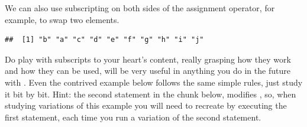 \documentclass[krantz2]{krantz}\usepackage{knitr}
\begin{document}
We can also use subscripting on both sides of the assignment operator, for example, to swap two elements.

\begin{knitrout}\footnotesize
{}\color{fgcolor}\begin{kframe}
\begin{alltt}
 \hlkwb{<-} \hlstd{letters[}\hlopt{:}\hlstd{]}
\hlstd{a[}\hlopt{:}\hlstd{]} \hlkwb{<-} \hlstd{a[}\hlopt{:}\hlstd{]}
\end{alltt}
\begin{verbatim}
##  [1] "b" "a" "c" "d" "e" "f" "g" "h" "i" "j"
\end{verbatim}
\end{kframe}
\end{knitrout}

\begin{playground}
Do play with subscripts to your heart's content, really grasping how they work and how they can be used, will be very useful in anything you do in the future with \Rlang. Even the contrived example below follows the same simple rules, just study it bit by bit. Hint: the second statement in the chunk below, modifies , so, when studying variations of this example you will need to recreate  by executing the first statement, each time you run a variation of the second statement.

\begin{knitrout}\footnotesize
{}\color{fgcolor}\begin{kframe}
\begin{alltt}
 \hlkwb{<-} \hlstd{letters[}\hlopt{:}\hlstd{]}
\hlstd{a[}\hlopt{:}\hlstd{]} \hlkwb{<-} \hlstd{a[}\hlstd{(}\hlstd{,}\hlstd{)]}
\end{alltt}
\end{kframe}
\end{knitrout}

\end{playground}
\end{document}
